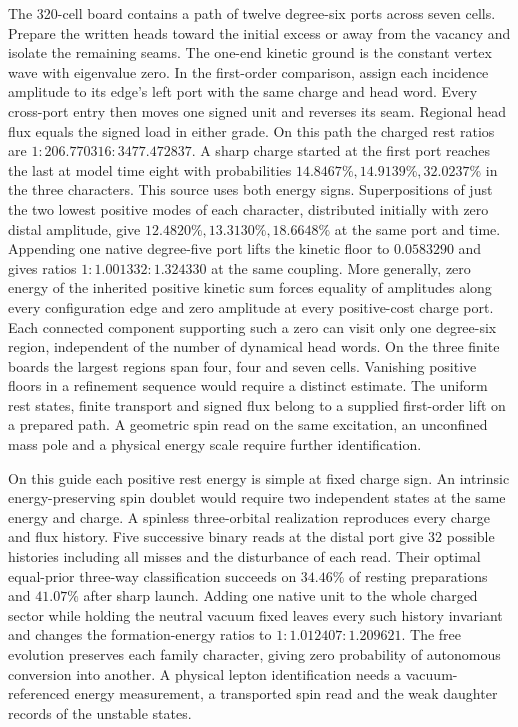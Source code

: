 The 320-cell board contains a path of twelve degree-six ports across
seven cells. Prepare the written heads toward the initial excess or away
from the vacancy and isolate the remaining seams. The one-end kinetic
ground is the constant vertex wave with eigenvalue zero. In the first-order
comparison, assign each incidence amplitude to its edge's left port with
the same charge and head word. Every cross-port entry then moves one signed
unit and reverses its seam. Regional head flux equals the signed load
in either grade. On this path the charged rest ratios are
$1:206.770316:3477.472837$. A sharp charge started at the first
port reaches the last at model time eight with probabilities
$14.8467\%,14.9139\%,32.0237\%$ in the three characters. This source
uses both energy signs. Superpositions of just the two lowest positive
modes of each character, distributed initially with zero distal amplitude,
give $12.4820\%,13.3130\%,18.6648\%$ at the same port and time.
Appending one native degree-five port lifts the kinetic floor to $0.0583290$
and gives ratios $1:1.001332:1.324330$ at the same coupling.
More generally, zero energy of the inherited positive kinetic sum
forces equality of amplitudes along every configuration edge and zero
amplitude at every positive-cost charge port. Each connected component
supporting such a zero can visit only one degree-six region, independent
of the number of dynamical head words. On the three finite boards the
largest regions span four, four and seven cells. Vanishing positive
floors in a refinement sequence would require a distinct estimate.
The uniform
rest states, finite transport and signed flux belong to a supplied
first-order lift on a prepared path. A geometric spin read on the
same excitation, an unconfined mass pole and a physical energy scale
require further identification.

On this guide each positive rest energy is simple at fixed charge sign.
An intrinsic energy-preserving spin doublet would require two independent states
at the same energy and charge. A spinless three-orbital realization reproduces
every charge and flux history. Five successive binary reads at the distal port
give 32 possible histories including all misses and the disturbance of each read.
Their optimal equal-prior three-way classification succeeds on $34.46\%$ of resting
preparations and $41.07\%$ after sharp launch. Adding one native unit to the
whole charged sector while holding the neutral vacuum fixed leaves every such
history invariant and changes the formation-energy ratios to
$1:1.012407:1.209621$. The free evolution preserves each family character,
giving zero probability of autonomous conversion into another. A physical
lepton identification needs a vacuum-referenced energy measurement, a
transported spin read and the weak daughter records of the unstable states.

